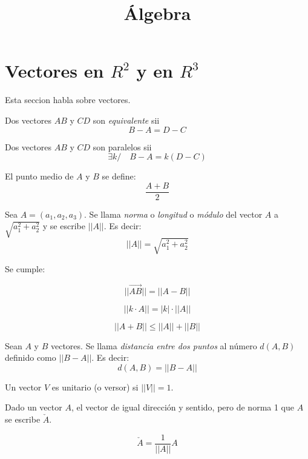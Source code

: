 \documentclass[alge.tex]{subfiles}
\title{\'Algebra}
\begin{document}
\maketitle
\section{Vectores en \(R^2\) y en \(R^3\)}
Esta seccion habla sobre vectores.
\begin{mydef}
  Dos vectores \(AB\) y \(CD\) son \emph{equivalente} sii 
  \[ B - A = D - C \]
\end{mydef}

\begin{mydef}
  Dos vectores \(AB\) y \(CD\) son paralelos sii
  \[\exists k / \quad B - A = k(D-C)\]
\end{mydef}

\begin{mydef}
  El punto medio de \(A\) y \(B\) se define:
  \[\frac{A+B}{2}\]
\end{mydef}

\begin{mydef}
  Sea \(A = (a_1, a_2, a_3)\). Se llama \emph{norma} o \emph{longitud} o
  \emph{m\'odulo} del vector \(A\) a \(\sqrt{a_1^2 + a_2^2}\) y se
  escribe \(||A||\). Es decir:
  \[||A|| = \sqrt{a_1^2 + a_2^2}\]
\end{mydef}
Se cumple:
\begin{teo}
  \[||\overrightarrow{AB}|| = || A-B ||\]
\end{teo}
\begin{teo}
  \[||k \cdot A|| = |k| \cdot ||A||\]
\end{teo}

\begin{teo}
  \[||A+B|| \leq ||A|| + ||B||\]
\end{teo}
\begin{mydef}
  Sean \(A\) y \(B\) vectores. Se llama \emph{distancia entre dos
    puntos} al n\'umero \(d(A,B)\) definido como \(||B-A||\). Es decir:
  \[d(A,B) = ||B-A||\]
\end{mydef}

\begin{mydef}
  Un vector \(V\) es unitario (o versor) si \(||V||=1\).
\end{mydef}
Dado un vector \(A\), el vector de igual direcci\'on y sentido, pero de
norma 1 que \(A\) se escribe \(\check{A}\).
\begin{teo}
  \[\check{A}=\frac{1}{||A||} A\]
\end{teo}
\end{document}

